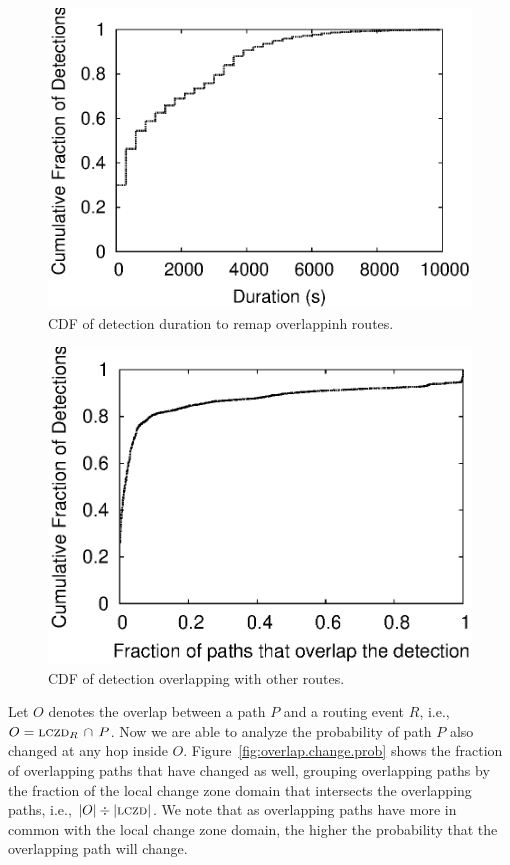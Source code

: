 \begin{figure}
\begin{center}
\includegraphics[width=0.8\columnwidth]{figs/patching/durationdetection/durationdetection.eps}
\caption{CDF of detection duration to remap overlappinh routes. }
\label{fig:overlap.delay.cdf}
\end{center}
%
\end{figure}
%
\begin{figure}
\begin{center}
\includegraphics[width=0.8\columnwidth]{figs/patching/routesoverlapping/routesoverlapping.eps}
\caption{CDF of detection overlapping with other routes.}
\label{fig:join.acc}
\end{center}
%
\end{figure}

Let $O$ denotes the overlap between a path $P$ and a routing event $R$, i.e.,
$O = \mathrm{\textsc{lczd}}_{R}\,\cap\,P$. Now we are able to analyze the probability of path $P$ 
also changed at any hop inside $O$. Figure~\ref{fig:overlap.change.prob} shows
the fraction of overlapping paths that have changed as well, grouping
overlapping paths by the fraction of the local change zone domain
that intersects the overlapping paths, i.e.,
$|O|\div|\mathrm{\textsc{lczd}}|$.  We note that as overlapping paths
have more in common with the local change zone domain, the higher
the probability that the overlapping path will change.  


